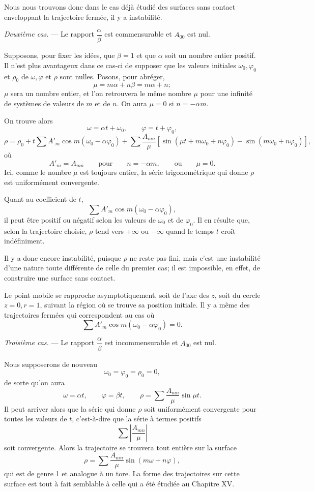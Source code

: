 \documentclass[11pt]{article}
\begin{document}
Nous nous trouvons donc dans le cas déjà étudié des surfaces sans contact enveloppant la trajectoire fermée, il y a instabilité.

\emph{Deuxième cas.} — Le rapport $\dfrac{\alpha}{\beta}$ est commensurable et $A_{00}$ est nul.

Supposons, pour fixer les idées, que $\beta=1$ et que $\alpha$ soit un nombre entier positif. Il n’est plus avantageux dans ce cas-ci de supposer que les valeurs initiales $\omega_0,\varphi_0$ et $\rho_0$ de $\omega,\varphi$ et $\rho$ sont nulles. Posons, pour abréger,
\[
\mu=m\alpha+n\beta=m\alpha+n;
\]
$\mu$ sera un nombre entier, et l’on retrouvera le même nombre $\mu$ pour une infinité de systèmes de valeurs de $m$ et de $n$. On aura $\mu=0$ si $n=-\alpha m$.

On trouve alors
\[
\omega=\alpha t+\omega_0,
\qquad
\varphi=t+\varphi_0,
\]
\[
\rho=\rho_0+t\sum A'_m\cos m(\omega_0-\alpha\varphi_0)
+\sum \frac{A_{mn}}{\mu}\left[\sin(\mu t+m\omega_0+n\varphi_0)-\sin(m\omega_0+n\varphi_0)\right],
\]
où
\[
A'_m=A_{mn}
\qquad \text{pour}\qquad n=-\alpha m,
\qquad \text{ou}\qquad \mu=0.
\]
Ici, comme le nombre $\mu$ est toujours entier, la série trigonométrique qui donne $\rho$ est uniformément convergente.

Quant au coefficient de $t$,
\[
\sum A'_m\cos m(\omega_0-\alpha\varphi_0),
\]
il peut être positif ou négatif selon les valeurs de $\omega_0$ et de $\varphi_0$. Il en résulte que, selon la trajectoire choisie, $\rho$ tend vers $+\infty$ ou $-\infty$ quand le temps $t$ croît indéfiniment.

Il y a donc encore instabilité, puisque $\rho$ ne reste pas fini, mais c’est une instabilité d’une nature toute différente de celle du premier cas; il est impossible, en effet, de construire une surface sans contact.

Le point mobile se rapproche asymptotiquement, soit de l’axe des $z$, soit du cercle $z=0,r=1$, suivant la région où se trouve sa position initiale. Il y a même des trajectoires fermées qui correspondent au cas où
\[
\sum A'_m\cos m(\omega_0-\alpha\varphi_0)=0.
\]

\emph{Troisième cas.} — Le rapport $\dfrac{\alpha}{\beta}$ est incommensurable et $A_{00}$ est nul.

Nous supposerons de nouveau
\[
\omega_0=\varphi_0=\rho_0=0,
\]
de sorte qu’on aura
\[
\omega=\alpha t,
\qquad
\varphi=\beta t,
\qquad
\rho=\sum \frac{A_{mn}}{\mu}\sin\mu t.
\]
Il peut arriver alors que la série qui donne $\rho$ soit uniformément convergente pour toutes les valeurs de $t$, c’est-à-dire que la série à termes positifs
\begin{equation}
\sum \left|\frac{A_{mn}}{\mu}\right|
\tag{9}
\end{equation}
soit convergente. Alors la trajectoire se trouvera tout entière sur la surface
\[
\rho=\sum \frac{A_{mn}}{\mu}\sin(m\omega+n\varphi),
\]
qui est de genre 1 et analogue à un tore. La forme des trajectoires sur cette surface est tout à fait semblable à celle qui a été étudiée au Chapitre XV.
\end{document}
